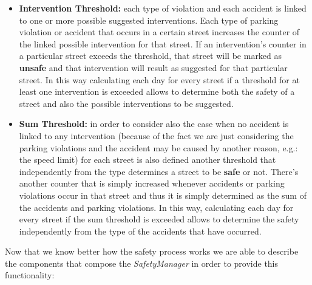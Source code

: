 			\begin{itemize}
				\item \textbf{Intervention Threshold:} each type of violation and each accident is linked to one or more possible suggested interventions. Each type of parking violation or accident that occurs in a certain street increases the counter of the linked possible intervention for that street. If an intervention's counter in a particular street exceeds the threshold, that street will be marked as \textbf{unsafe} and that intervention will result as suggested for that particular street. In this way calculating each day for every street if a threshold for at least one intervention is exceeded allows to determine both the safety of a street and also the possible interventions to be suggested.
				
				\item \textbf{Sum Threshold:} in order to consider also the case when no accident is linked to any intervention (because of the fact we are just considering the parking violations and the accident may be caused by another reason, e.g.: the speed limit) for each street is also defined another threshold that independently from the type determines a street to be \textbf{safe} or not. There's another counter that is simply increased whenever accidents or parking violations occur in that street and thus it is simply determined as the sum of the accidents and parking violations. In this way, calculating each day for every street if the sum threshold is exceeded allows to determine the safety independently from the type of the accidents that have occurred.
			\end{itemize}
		
			Now that we know better how the safety process works we are able to describe the components that compose the \emph{SafetyManager} in order to provide this functionality:
			
